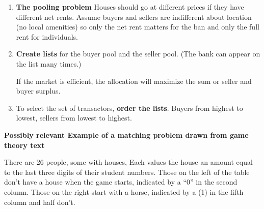 \begin{enumerate}
\item \textbf{The pooling problem}  Houses should go at different prices if they have different net rents.  Assume buyers and sellers are indifferent about location (no  local amenities) so only the net rent matters for the ban and only the full rent for individuals.

\item \textbf{Create lists} for the buyer pool and the seller pool. (The bank can appear on the list many times.) 

If the market is efficient, the allocation will maximize the sum or seller and buyer surplus.

\item To select the set of transactors, \textbf{order the lists}. Buyers from highest to lowest, sellers from lowest to highest.

\end{enumerate}



\newpage
\textbf{Possibly relevant Example of a matching problem drawn from game theory text}

There are 26  people, some with houses, Each values the house an amount equal to the last three digits of their student numbers. Those on the left of the table don't have a house when the game starts, indicated by a ``0'' in the second column. Those on the right  start with a horse, indicated by a  (1) in the fifth column and half don't. 

